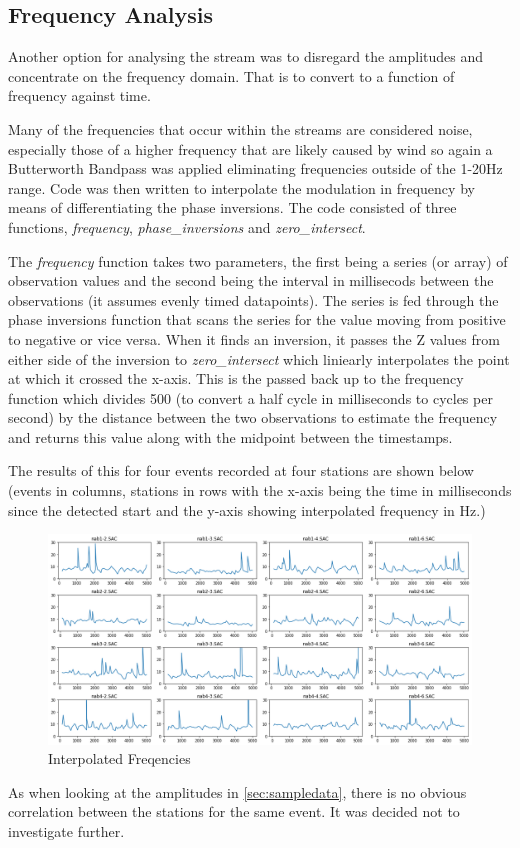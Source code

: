 \documentclass[../report.tex]{subfiles}
\begin{document}
\subsection{Frequency Analysis}
	Another option for analysing the stream was to disregard the amplitudes and concentrate on the frequency domain.  That is to convert to a function of frequency against time.
	
	Many of the frequencies that occur within the streams are considered noise, especially those of a higher frequency that are likely caused by wind so again a Butterworth Bandpass \citep{bandpass} was applied eliminating frequencies outside of the 1-20Hz range.  Code was then written to interpolate the modulation in frequency by means of differentiating the phase inversions.  The code consisted of three functions, \textit{frequency}, \textit{phase\_inversions} and \textit{zero\_intersect}.
	
	The \textit{frequency} function takes two parameters, the first being a series (or array) of observation values and the second being the interval in millisecods between the observations (it assumes evenly timed datapoints).  The series is fed through the phase inversions function that scans the series for the value moving from positive to negative or vice versa.  When it finds an inversion, it passes the Z values from either side of the inversion to \textit{zero\_intersect} which liniearly interpolates the point at which it crossed the x-axis.  This is the passed back up to the frequency function which divides 500 (to convert a half cycle in milliseconds to cycles per second) by the distance between the two observations to estimate the frequency and returns this value along with the midpoint between the timestamps.
	
	The results of this for four events recorded at four stations are shown below (events in columns, stations in rows with the x-axis being the time in milliseconds since the detected start and the y-axis showing interpolated frequency in Hz.)

\begin{figure}[H]
	\centering
	\includegraphics[width=1\linewidth]{img/freq_anal}
	\caption{Interpolated Freqencies}
	\label{fig:freq_anal}
\end{figure}

	As when looking at the amplitudes in \cref{sec:sampledata}, there is no obvious correlation between the stations for the same event.  It was decided not to investigate further.
\end{document}
